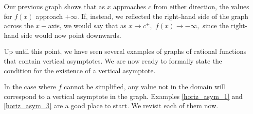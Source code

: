 \documentclass[12pt]{book}
\theoremstyle{definition}
\begin{document}
Our previous graph shows that as $x$ approaches $c$ from either direction, the values for $f(x)$ approach $+\infty$.  If, instead, we reflected the right-hand side of the graph across the $x-$axis, we would say that as $x\rightarrow c^+,$ $f(x)\rightarrow -\infty,$ since the right-hand side would now point downwards.
\par
Up until this point, we have seen several examples of graphs of rational functions that contain vertical asymptotes.  We are now ready to formally state the condition for the existence of a vertical asymptote.
\begin{center}
\end{center}
In the case where $f$ cannot be simplified, any value not in the domain will correspond to a vertical asymptote in the graph.  Examples \ref{horiz_asym_1} and \ref{horiz_asym_3} are a good place to start.  We revisit each of them now.
\end{document}
